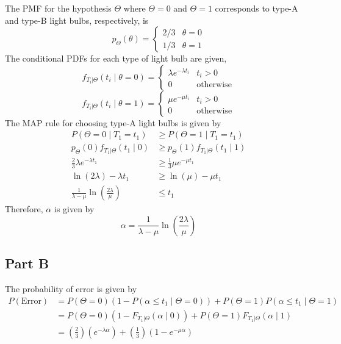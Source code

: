 \documentclass{article}
\begin{document}
The PMF for the hypothesis $\Theta$ where $\Theta = 0$ and $\Theta = 1$
corresponds to type-A and type-B light bulbs, respectively, is
$$ p_{\Theta}(\theta) = \begin{cases}
  2/3 & \theta = 0 \\
  1/3 & \theta = 1
\end{cases} $$
The conditional PDFs for each type of light bulb are given,
$$ f_{T_i|\Theta}(t_i \mid \theta = 0) = \begin{cases}
  \lambda e^{-\lambda t_i} & t_i > 0 \\
  0 & \mathrm{otherwise}
\end{cases} $$
$$ f_{T_i|\Theta}(t_i \mid \theta = 1) = \begin{cases}
  \mu e^{-\mu t_i} & t_i > 0 \\
  0 & \mathrm{otherwise}
\end{cases} $$
The MAP rule for choosing type-A light bulbs is given by
\begin{align*}
  P(\Theta = 0 \mid T_1 = t_1) &\geq P(\Theta = 1 \mid T_1 = t_1) \\
  p_\Theta(0) f_{T_1|\Theta}(t_1 \mid 0) &\geq p_\Theta(1) f_{T_1|\Theta}(t_1 \mid 1) \\
  \frac{2}{3} \lambda e^{-\lambda t_1} &\geq \frac{1}{3} \mu e^{-\mu t_1} \\
  \ln(2\lambda) - \lambda t_1 &\geq \ln(\mu) - \mu t_1 \\
  \frac{1}{\lambda - \mu} \ln\left(\frac{2\lambda}{\mu}\right) &\leq t_1
\end{align*}
Therefore, $\alpha$ is given by
$$ \alpha = \frac{1}{\lambda - \mu} \ln\left(\frac{2\lambda}{\mu}\right) $$

\subsection*{Part B}

The probability of error is given by
\begin{align*}
  P(\mathrm{Error}) &= P(\Theta = 0)(1 - P(\alpha \leq t_1 \mid \Theta = 0))
  + P(\Theta = 1) P(\alpha \leq t_1 \mid \Theta = 1) \\
  &= P(\Theta = 0)(1 - F_{T_1|\Theta}(\alpha \mid 0))
  + P(\Theta = 1) F_{T_1|\Theta}(\alpha \mid 1) \\
  &= \left(\frac{2}{3}\right) \left(e^{-\lambda \alpha}\right) +
  \left(\frac{1}{3}\right)\left(1 - e^{-\mu \alpha}\right)
\end{align*}
\end{document}
